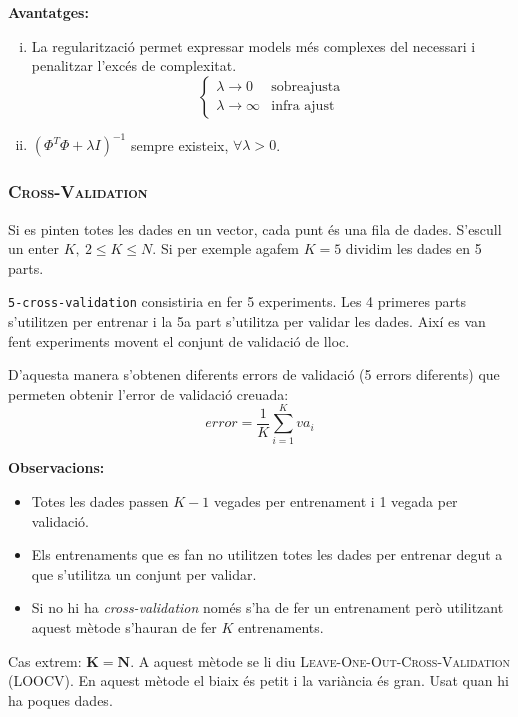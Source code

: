 \documentclass[a4paper]{article}
\begin{document}
\textbf{Avantatges:}

\begin{enumerate}[i)]
	\item La regularització permet expressar models més complexes del necessari i penalitzar l'excés de complexitat.
	$$
	\begin{cases}
		\lambda \rightarrow 0 &\text{sobreajusta} \\
		\lambda \rightarrow \infty &\text{infra ajust}
	\end{cases}
	$$
	
	\item $\left( \Phi^T \Phi + \lambda I \right)^{-1}$ sempre existeix, $\forall \lambda > 0$.
\end{enumerate}

\subsubsection{\textsc{Cross-Validation}}


Si es pinten totes les dades en un vector, cada punt és una fila de dades. S'escull un enter $K, \ 2 \le K \le N$. Si per exemple agafem $K=5$ dividim les dades en 5 parts. 

\verb|5-cross-validation| consistiria en fer 5 experiments. Les 4 primeres parts s'utilitzen per entrenar i la 5a part s'utilitza per validar les dades. Així es van fent experiments movent el conjunt de validació de lloc.

D'aquesta manera s'obtenen diferents errors de validació (5 errors diferents) que permeten obtenir l'error de validació creuada:
$$
error = \frac{1}{K} \sum_{i=1}^K va_i
$$

\textbf{Observacions:}
\begin{itemize}
	\item Totes les dades passen $K - 1$ vegades per entrenament i 1 vegada per validació.
	\item Els entrenaments que es fan no utilitzen totes les dades per entrenar degut a que s'utilitza un conjunt per validar.
	\item Si no hi ha \emph{cross-validation} només s'ha de fer un entrenament però utilitzant aquest mètode s'hauran de fer $K$ entrenaments.
\end{itemize}

Cas extrem: $\boldsymbol{K=N}$. A aquest mètode se li diu \textsc{Leave-One-Out-Cross-Validation} (LOOCV). En aquest mètode el biaix és petit i la variància és gran. Usat quan hi ha poques dades.
\end{document}

